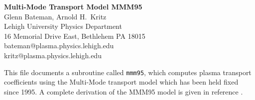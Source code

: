 %
 
\headheight 0pt \headsep 0pt  \topmargin 0pt  \oddsidemargin 0pt
\textheight 9.0in \textwidth 6.5in

\begin{center}
\Large {\bf Multi-Mode Transport Model MMM95} \\
\vspace{1pc} \normalsize
Glenn Bateman, Arnold H.~Kritz \\
 Lehigh University Physics Department \\
16 Memorial Drive East, Bethlehem PA 18015 \\
bateman@plasma.physics.lehigh.edu \\
kritz@plasma.physics.lehigh.edu
\end{center}

This file documents a subroutine called {\tt mmm95}, which computes
plasma transport coefficients using the Multi-Mode transport model
which has been held fixed since 1995.  A complete derivation of the
MMM95 model is given in reference \cite{bate98a}.

